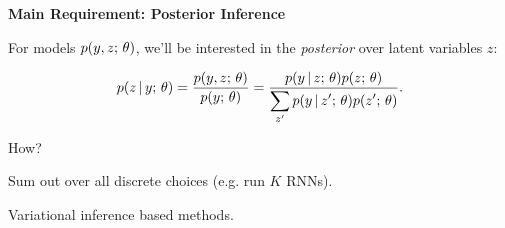 \documentclass[aspectratio=169,12pt]{beamer}
\let\tempone\itemize
\let\temptwo\enditemize
\renewenvironment{itemize}{\tempone\addtolength{\itemsep}{0.5\baselineskip}}{\temptwo}
\newcommand{\thetitle}[1]{{\begin{center}\textbf{{#1}}\end{center}}}
\newcommand{\air}{\vspace{0.25cm}}
\begin{document}





\begin{frame}\thetitle{Main Requirement: Posterior Inference}
    For models $p(y, z ; \, \theta)$, we'll be interested in the \textit{posterior} over latent variables $z$:

    \begin{align*}
        p(z \,|\, y ; \, \theta) = \frac{\displaystyle p(y, z ; \, \theta)}{\displaystyle p(y ; \, \theta)} = \frac{\displaystyle p(y\,|\, z ; \,  \theta) p(z ; \,  \theta)}{\displaystyle \sum_{z'} p(y \,|\, z'; \,  \theta) p(z'; \,  \theta) }.
    \end{align*}

    \air





    How?

    \begin{itemize}
    \item Sum out over all discrete choices (e.g. run $K$ RNNs).
    \item Variational inference based methods.
    \end{itemize}
\end{frame}
\end{document}
